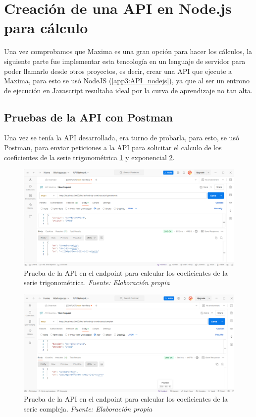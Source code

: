 \section{Creación de una API en Node.js para cálculo}
Una vez comprobamos que Maxima es una gran opción para hacer los cálculos, la siguiente parte fue implementar esta tencología en un lenguaje de servidor para poder llamarlo desde otros proyectos, es decir, crear una API que ejecute a Maxima, para esto se usó NodeJS (\ref{app3:API_nodejs}), ya que al ser un entrono de ejecución en Javascript resultaba ideal por la curva de aprendizaje no tan alta.

\subsection{Pruebas de la API con Postman}
Una vez se tenía la API desarrollada, era turno de probarla, para esto, se usó Postman, para enviar peticiones a la API para solicitar el calculo de los coeficientes de la serie trigonométrica \ref{fig:postman_trig} y exponencial \ref{fig:postman_complex}.
\begin{figure}[H]
	\centering
	\includegraphics[width=1\textwidth]{img/chapter06/postman_trig.png}
	\caption[Prueba de la API en el endpoint para calcular los coeficientes de la serie trigonométrica.]{Prueba de la API en el endpoint para calcular los coeficientes de la serie trigonométrica. \textit{Fuente: Elaboración propia}}
	\label{fig:postman_trig}
\end{figure}

\begin{figure}[H]
	\centering
	\includegraphics[width=1\textwidth]{img/chapter06/postman_complex.png}
	\caption[Prueba de la API en el endpoint para calcular los coeficientes de la serie compleja.]{Prueba de la API en el endpoint para calcular los coeficientes de la serie compleja. \textit{Fuente: Elaboración propia}}
	\label{fig:postman_complex}
\end{figure}


